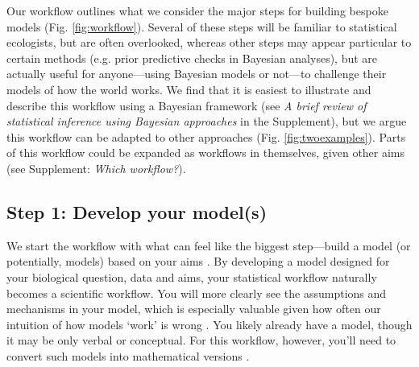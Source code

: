 \documentclass[11pt]{article}
\newcommand{\R}[1]{\label{}\linelabel{#1}}
\begin{document}
Our workflow outlines what we consider the major steps for building bespoke models (Fig. \ref{fig:workflow}). Several of these steps will be familiar to statistical ecologists, but are often overlooked, whereas other steps may appear particular to certain methods (e.g. prior predictive checks in Bayesian analyses), but are actually useful for anyone---using Bayesian models or not---to challenge their models of how the world works. We find that it is easiest to illustrate and describe \R{beyondMCMC2} this workflow using a Bayesian framework (see \emph{A brief review of statistical inference using Bayesian approaches} in the Supplement), but we argue this workflow can be adapted to other\R{beyondMCMC3} approaches (Fig. \ref{fig:twoexamples}).
Parts of this workflow could be expanded as workflows in themselves, given other aims (see Supplement: \emph{Which workflow?}). %

\subsection*{Step 1: Develop your model(s)} 

We start the workflow with what can feel like the biggest step---build a model (or potentially, models) based on your aims \citep{hilborn2013ecological}. By developing a model designed for your biological question, data and aims, your statistical workflow naturally becomes a scientific workflow. You will more clearly see the assumptions and mechanisms in your model, which is especially valuable given how often our intuition of how models `work' is wrong \citep{kokko2005useful}. You likely already have a model, though it may be only verbal or conceptual. For this workflow, however, you’ll need to convert such models into mathematical versions \citep{servedio2014not}. %
\end{document}
